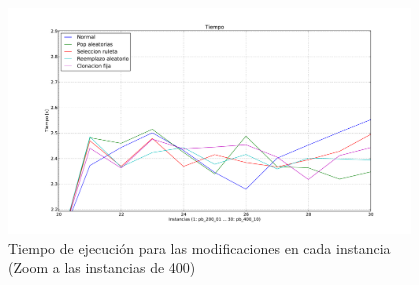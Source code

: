 \begin{figure}[H]
\begin{center}
\includegraphics[width=0.95\textwidth]{img/t-zoom400.pdf}
\end{center}
\caption{Tiempo de ejecución para las modificaciones en cada instancia (Zoom a las instancias de 400)}
\label{fig:t400}
\end{figure}
